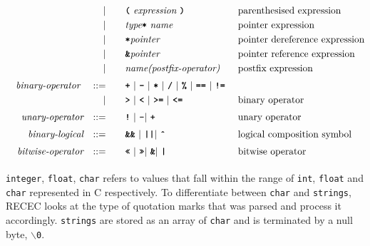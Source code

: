 \documentclass[a4paper]{article}
\begin{document}
\begin{alignat*}{9}
	&&                       && |   &\quad &&  \textbf{\texttt{(}}\  \textit{expression} \ 
												\textbf{\texttt{)}} && \textrm{{parenthesised expression}}\\
	&&                       && |   &\quad &&   \textit{type}  \textbf{\texttt{*}}  \ \textit{name}  && \textrm{{pointer expression}}\\
	&&                       && |   &\quad &&  \textbf{\texttt{*}}  \textit{pointer}  && \textrm{{pointer dereference expression}}\\
	&&                       && |   &\quad &&  \textbf{\texttt{\&}}  \textit{pointer}  && \textrm{{pointer reference expression}}\\
	&&                       && |   &\quad &&  \textit{name} \textit{(postfix-operator)}  && \textrm{{postfix expression}}\\[1mm]
	&& \textit{binary-operator}    \ 
							&& ::= &\quad && \textbf{\texttt{+}}\ |\ \textbf{\texttt{-}}\ |\ \textbf{\texttt{*}}\ |\ \textbf{\texttt{/}}\ |\ \textbf{\texttt{\%}}\ |\ 
									   \textbf{\texttt{==}}\ |\ \textbf{\texttt{!=}}\ \\
	&&                       && |  &\quad &&  \texttt{\textbf{>}}\ |\ \texttt{\textbf{<}}\ |\ \texttt{\textbf{>=}}\ |\ \texttt{\textbf{<=}}
											  && \textrm{{binary operator}}\\[1mm]
	&& \textit{unary-operator}    
							&& ::= &\quad && \textbf{\texttt{!}}\ |\ \textbf{\texttt{-}} |\ \textbf{\texttt{+}}
							&& \textrm{{unary operator}}\\[1mm]          
	&& \textit{binary-logical}   && ::=  &\quad &&  \textbf{\texttt{\&\&}}\ |\ \texttt{\textbf{||}} |\ \texttt{\textbf{\^}}
											  && \textrm{{logical composition symbol}}\\[1mm]
	&& \textit{bitwise-operator}   && ::=  &\quad &&  \textbf{\texttt{<<}}\ |\ \texttt{\textbf{>>}}  |\ \texttt{\textbf{\&}} |\ \texttt{\textbf{|}}
											  && \textrm{{bitwise operator}}\\[1mm]
\end{alignat*}

\texttt{integer}, \texttt{float}, \texttt{char} refers to values that fall within the range of \texttt{int}, \texttt{float} and \texttt{char} represented in C respectively. To differentiate between \texttt{char} and \texttt{strings}, RECEC looks at the type of quotation marks that was parsed and process it accordingly. \texttt{strings} are stored as an array of \texttt{char} and is terminated by a null byte, \texttt{$\backslash$0}.
\end{document}
